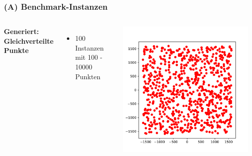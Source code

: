 \documentclass[aspectratio=169]{beamer}
\begin{document}
\begin{frame}
	\frametitle{(A) Benchmark-Instanzen}
	\begin{columns}[c] %
	
	\textbf{Generiert: Gleichverteilte Punkte}
	\begin{itemize}
		\item 100 Instanzen mit 100 - 10000 Punkten
	\end{itemize}
	
	\includegraphics[scale=.5]{random_big.pdf}
	

	\end{columns}
	\end{frame}

\end{document}
